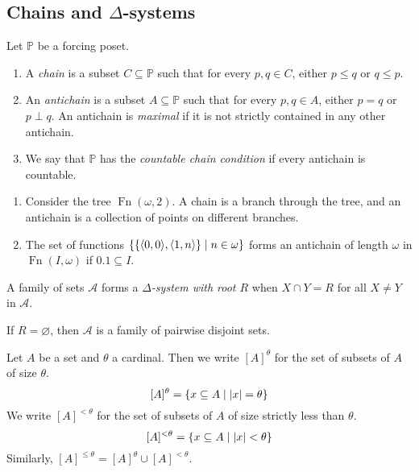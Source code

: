 \subsection{Chains and \texorpdfstring{\( \Delta \)}{Δ}-systems}
\begin{definition}
    Let \( \mathbb P \) be a forcing poset.
    \begin{enumerate}
        \item A \emph{chain} is a subset \( C \subseteq \mathbb P \) such that for every \( p, q \in C \), either \( p \leq q \) or \( q \leq p \).
        \item An \emph{antichain} is a subset \( A \subseteq \mathbb P \) such that for every \( p, q \in A \), either \( p = q \) or \( p \perp q \).
        An antichain is \emph{maximal} if it is not strictly contained in any other antichain.
        \item We say that \( \mathbb P \) has the \emph{countable chain condition} if every antichain is countable.
    \end{enumerate}
\end{definition}
\begin{example}
    \begin{enumerate}
        \item Consider the tree \( \operatorname{Fn}(\omega, 2) \).
        A chain is a branch through the tree, and an antichain is a collection of points on different branches.
        \item The set of functions \( \qty{\qty{\langle 0, 0 \rangle, \langle 1, n \rangle} \mid n \in \omega} \) forms an antichain of length \( \omega \) in \( \operatorname{Fn}(I, \omega) \) if \( \qty{0,1} \subseteq I \).
    \end{enumerate}
\end{example}
\begin{definition}
    A family of sets \( \mathcal A \) forms a \emph{\( \Delta \)-system with root \( R \)} when \( X \cap Y = R \) for all \( X \neq Y \) in \( \mathcal A \).
\end{definition}
\begin{example}
    If \( R = \varnothing \), then \( \mathcal A \) is a family of pairwise disjoint sets.
\end{example}
\begin{definition}
    Let \( A \) be a set and \( \theta \) a cardinal.
    Then we write \( [A]^\theta \) for the set of subsets of \( A \) of size \( \theta \).
    \[ [A]^\theta = \qty{x \subseteq A \mid \abs{x} = \theta} \]
    We write \( [A]^{<\theta} \) for the set of subsets of \( A \) of size strictly less than \( \theta \).
    \[ [A]^{<\theta} = \qty{x \subseteq A \mid \abs{x} < \theta} \]
    Similarly, \( [A]^{\leq\theta} = [A]^\theta \cup [A]^{<\theta} \).
\end{definition}
